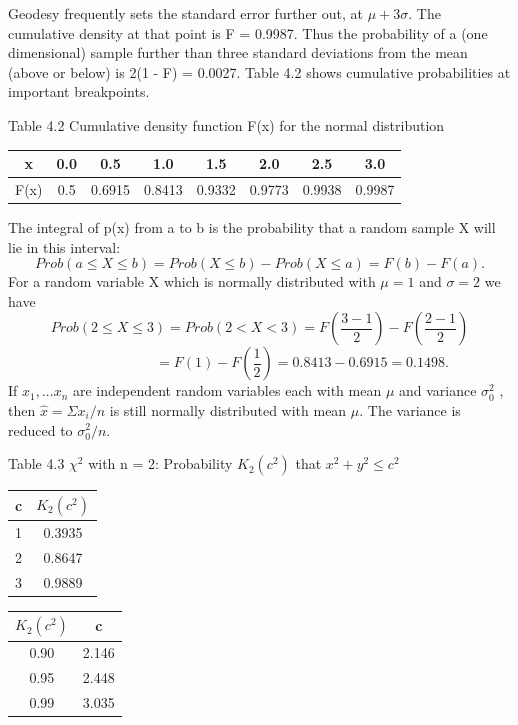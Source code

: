 Geodesy frequently sets the standard error further out, at $\mu+3\sigma$. The cumulative
density at that point is F = 0.9987. Thus the probability of a (one dimensional) sample
further than three standard deviations from the mean (above or below) is 2(1 - F) = 0.0027. Table 4.2 shows cumulative probabilities at important breakpoints.
\begin{table}
	Table 4.2 \;  Cumulative density function F(x) for the normal distribution
\centering
\begin{tabular}{c c c c c c c c}
	\hline 
	x & 0.0 & 0.5 & 1.0 & 1.5 & 2.0 & 2.5 & 3.0 \\ 
	\hline 
	F(x) & 0.5 & 0.6915 & 0.8413 & 0.9332 & 0.9773 & 0.9938 & 0.9987 \\ 
	\hline 
\end{tabular} 
\end{table}


The integral of p(x) from a to b is the probability that a random sample X will lie in
this interval:
\begin{equation*}
Prob(a\leq X \leq b)=Prob(X \leq b)-Prob(X \leq a)=F(b)-F(a).
\end{equation*} 
For a random variable X which is normally distributed with $\mu=1$ and $\sigma=2$ we have
\begin{equation*}
Prob(2\leq X \leq 3)=Prob(2<X<3)=F(\frac{3-1}{2}) - F(\frac{2-1}{2})
\end{equation*}
\begin{equation*}
\qquad\qquad\qquad=F(1)-F(\frac{1}{2})=0.8413-0.6915=0.1498.
\end{equation*}
If $x_1,...x_n$ are independent random variables each with mean $\mu$ and variance $\sigma^2_0$ , then $\hat{x}=\Sigma x_i/n$ is still normally distributed with mean $\mu$. The variance is reduced to $\sigma^2_0/n$.
\begin{table}
Table 4.3 \; $\chi^2$ with n = 2: Probability $K_2(c^2)$ that $x^2+y^2\leq c^2$\\
	\centering
\begin{tabular}{c c}
	\hline 
	c & $K_2(c^2)$ \\ 
	\hline 
	1 & 0.3935 \\ 
	2 & 0.8647 \\ 
	3 & 0.9889 \\ 
	\hline 
\end{tabular} 
\qquad
\begin{tabular}{c c}
	\hline 
	$K_2(c^2)$ & c \\ 
	\hline 
	0.90 & 2.146 \\ 
	0.95 & 2.448 \\ 
	0.99 & 3.035 \\ 
	\hline 
\end{tabular} 
\end{table}


